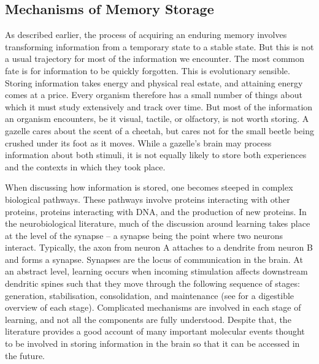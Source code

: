 \documentclass[
  jou,
  floatsintext,
  longtable,
  nolmodern,
  notxfonts,
  notimes,
  donotrepeattitle,
  colorlinks=true,linkcolor=blue,citecolor=blue,urlcolor=blue]{apa7}
\begin{document}
\subsection{Mechanisms of Memory Storage}\label{sec-mechanisms}

As described earlier, the process of acquiring an enduring memory
involves transforming information from a temporary state to a stable
state. But this is not a usual trajectory for most of the information we
encounter. The most common fate is for information to be quickly
forgotten. This is evolutionary sensible. Storing information takes
energy and physical real estate, and attaining energy comes at a price.
Every organism therefore has a small number of things about which it
must study extensively and track over time. But most of the information
an organism encounters, be it visual, tactile, or olfactory, is not
worth storing. A gazelle cares about the scent of a cheetah, but cares
not for the small beetle being crushed under its foot as it moves. While
a gazelle's brain may process information about both stimuli, it is not
equally likely to store both experiences and the contexts in which they
took place.

When discussing how information is stored, one becomes steeped in
complex biological pathways. These pathways involve proteins interacting
with other proteins, proteins interacting with DNA, and the production
of new proteins. In the neurobiological literature, much of the
discussion around learning takes place at the level of the synapse -- a
synapse being the point where two neurons interact. Typically, the axon
from neuron A attaches to a dendrite from neuron B and forms a synapse.
Synapses are the locus of communication in the brain. At an abstract
level, learning occurs when incoming stimulation affects downstream
dendritic spines such that they move through the following sequence of
stages: generation, stabilisation, consolidation, and maintenance (see
 for a digestible
overview of each stage). Complicated mechanisms are involved in each
stage of learning, and not all the components are fully understood.
Despite that, the literature provides a good account of many important
molecular events thought to be involved in storing information in the
brain so that it can be accessed in the future.
\end{document}
